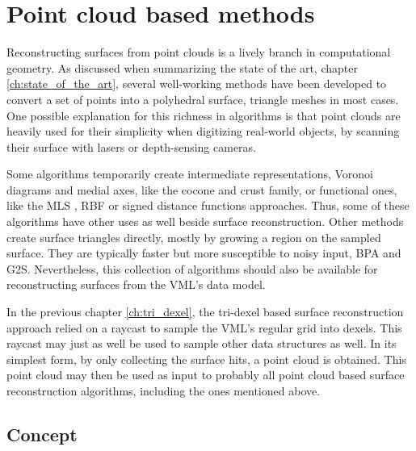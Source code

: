 
\chapter{Point cloud based methods}
\label{ch:point_cloud_based}

Reconstructing surfaces from point clouds is a lively branch in computational geometry.
As discussed when summarizing the state of the art, \cf chapter \ref{ch:state_of_the_art}, several well-working methods have been developed to convert a set of points into a polyhedral surface, \ie triangle meshes in most cases.
One possible explanation for this richness in algorithms is that point clouds are heavily used for their simplicity when digitizing real-world objects, \eg by scanning their surface with lasers or depth-sensing cameras.

Some algorithms temporarily create intermediate representations, \eg Voronoi diagrams and medial axes, like the cocone \cite{cocone, tight_cocone, robust_cocone} and crust \cite{crust, power_crust} family, or functional ones, like the MLS \cite{mls}, RBF \cite{rbf} or signed distance functions \cite{sdf_surface_reconstruction} approaches.
Thus, some of these algorithms have other uses as well beside surface reconstruction.
Other methods create surface triangles directly, mostly by growing a region on the sampled surface.
They are typically faster but more susceptible to noisy input, \eg BPA and G2S.
Nevertheless, this collection of algorithms should also be available for reconstructing surfaces from the VML's data model.

In the previous chapter \ref{ch:tri_dexel}, the tri-dexel based surface reconstruction approach relied on a raycast to sample the VML's regular grid into dexels.
This raycast may just as well be used to sample other data structures as well.
In its simplest form, by only collecting the surface hits, a point cloud is obtained.
This point cloud may then be used as input to probably all point cloud based surface reconstruction algorithms, including the ones mentioned above.


\section{Concept}
\label{sec:point_cloud_concept}


